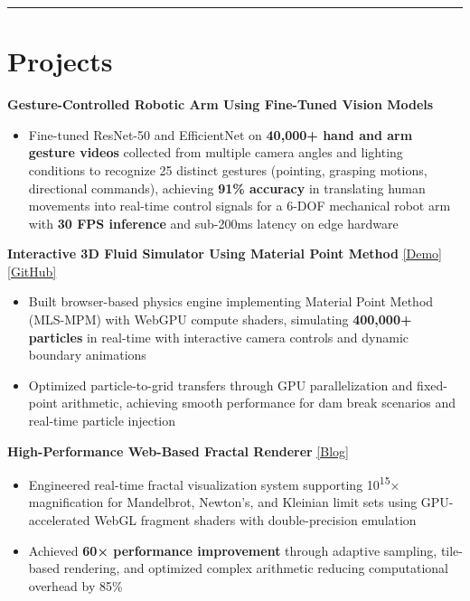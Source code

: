 \documentclass[11pt]{article}
\begin{document}
\noindent\rule{\textwidth}{0.5pt}

\section*{\textcolor{modernblue}{\Large Projects}}
\textbf{Gesture-Controlled Robotic Arm Using Fine-Tuned Vision Models}
\begin{itemize}[leftmargin=*, topsep=1pt, itemsep=1pt, parsep=0pt]
\item Fine-tuned ResNet-50 and EfficientNet on \textbf{40,000+ hand and arm gesture videos} collected from multiple camera angles and lighting conditions to recognize 25 distinct gestures (pointing, grasping motions, directional commands), achieving \textbf{91\% accuracy} in translating human movements into real-time control signals for a 6-DOF mechanical robot arm with \textbf{30 FPS inference} and sub-200ms latency on edge hardware
\end{itemize}

\vspace{3pt}
\noindent\textbf{Interactive 3D Fluid Simulator Using Material Point Method} \href{https://dimitrichrysafis.github.io/media/misc/fluidemo/index.html}{\underline{[Demo]}} \href{https://github.com/DimitriChrysafis/3d-Volumetric-Fluid-Simulator-From-Scratch}{\underline{[GitHub]}}
\begin{itemize}[leftmargin=*, topsep=1pt, itemsep=1pt, parsep=0pt]
\item Built browser-based physics engine implementing Material Point Method (MLS-MPM) with WebGPU compute shaders, simulating \textbf{400,000+ particles} in real-time with interactive camera controls and dynamic boundary animations
\item Optimized particle-to-grid transfers through GPU parallelization and fixed-point arithmetic, achieving smooth performance for dam break scenarios and real-time particle injection
\end{itemize}

\vspace{3pt}
\noindent\textbf{High-Performance Web-Based Fractal Renderer} \href{https://dimitrichrysafis.github.io/#post/post6.md}{\underline{[Blog]}}
\begin{itemize}[leftmargin=*, topsep=1pt, itemsep=1pt, parsep=0pt]
\item Engineered real-time fractal visualization system supporting 10\textsuperscript{15}× magnification for Mandelbrot, Newton's, and Kleinian limit sets using GPU-accelerated WebGL fragment shaders with double-precision emulation
\item Achieved \textbf{60× performance improvement} through adaptive sampling, tile-based rendering, and optimized complex arithmetic reducing computational overhead by 85\%
\end{itemize}
\end{document}
